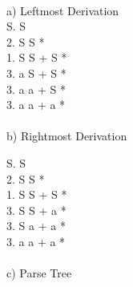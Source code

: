 \documentclass[letterpaper, 10pt,DIV=13]{scrartcl}
\numberwithin{equation}{section} %
\numberwithin{figure}{section} %
\numberwithin{table}{section} %
\begin{document}
\paragraph{} a) Leftmost Derivation\\

    S. S \\
    2. S S * \\
    1. S S + S *\\
    3. a S + S *\\
    3. a a + S *\\
    3. a a + a *\\


\paragraph{} b) Rightmost Derivation

    S. S \\
    2. S         S * \\
    1. S   S +   S *\\
    3. S   S +   a *\\
    3. S   a +   a *\\
    3. a   a +   a *\\

\paragraph{} c) Parse Tree




 

\pagebreak
\end{document}

